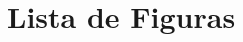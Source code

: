 \documentclass[
	article,			%
	11pt,				%
	oneside,			%
	a4paper,			%
	section=TITLE,		%
	english,			%
	brazil,				%
	sumario=tradicional
	]{abntex2}
\renewcommand{\imprimircapa}{%
  \begin{capa}%
    \center
    \ABNTEXchapterfont\Large \imprimirinstituicao
    \vspace{\onelineskip}
    \vspace{\onelineskip}
    
    \ABNTEXchapterfont\large\imprimirorientador
    
    \vspace*{\onelineskip}
    
    {\ABNTEXchapterfont\large\imprimirautor}

    \vfill
    \begin{center}
    \ABNTEXchapterfont\bfseries\HUGE\imprimirtitulo
    \end{center}
    \vfill
    
    \large\imprimirlocal

    \large\imprimirdata
    
    \vspace*{1cm}
  \end{capa}
}
\begin{document}

\imprimircapa

\tableofcontents*

\newpage 
\section*{Lista de Figuras}
\newpage



 
 


\textual
\end{document}
